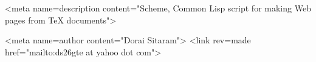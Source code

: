 
\htmlheadonly
<meta name=description content="Scheme, Common Lisp script for making Web pages
from TeX documents">

<meta name=author content="Dorai Sitaram">
<link rev=made href="mailto:ds26gte at yahoo dot com">

\endhtmlheadonly

\ifx{}
\def\spaceifnotempty{\eval{
(let ((x (ungroup (get-token))))
  (unless (all-blanks? x)
    (princ (code-char 92))
    (princ "space")))}}
\else
\def\spaceifnotempty{\eval{
(let ((x (ungroup (get-token))))
  (if (not (all-blanks? x))
      (begin (display (integer->char 92))
             (display "space"))
      0))
}}
\fi
